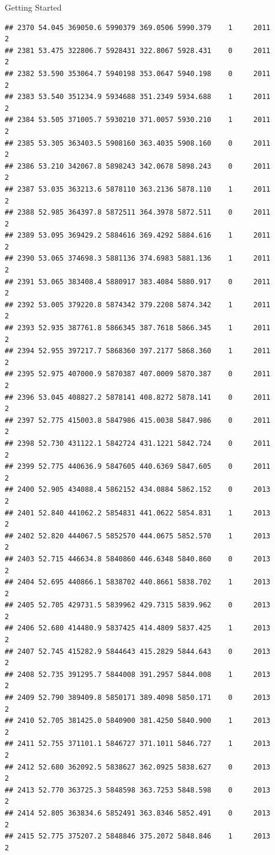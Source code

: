 \documentclass[
  ignorenonframetext,
]{beamer}
\begin{document}
\begin{frame}[fragile]{Getting Started}
\begin{verbatim}
## 2370 54.045 369050.6 5990379 369.0506 5990.379    1     2011        2
## 2381 53.475 322806.7 5928431 322.8067 5928.431    0     2011        2
## 2382 53.590 353064.7 5940198 353.0647 5940.198    0     2011        2
## 2383 53.540 351234.9 5934688 351.2349 5934.688    1     2011        2
## 2384 53.505 371005.7 5930210 371.0057 5930.210    1     2011        2
## 2385 53.305 363403.5 5908160 363.4035 5908.160    0     2011        2
## 2386 53.210 342067.8 5898243 342.0678 5898.243    0     2011        2
## 2387 53.035 363213.6 5878110 363.2136 5878.110    1     2011        2
## 2388 52.985 364397.8 5872511 364.3978 5872.511    0     2011        2
## 2389 53.095 369429.2 5884616 369.4292 5884.616    1     2011        2
## 2390 53.065 374698.3 5881136 374.6983 5881.136    1     2011        2
## 2391 53.065 383408.4 5880917 383.4084 5880.917    0     2011        2
## 2392 53.005 379220.8 5874342 379.2208 5874.342    1     2011        2
## 2393 52.935 387761.8 5866345 387.7618 5866.345    1     2011        2
## 2394 52.955 397217.7 5868360 397.2177 5868.360    1     2011        2
## 2395 52.975 407000.9 5870387 407.0009 5870.387    0     2011        2
## 2396 53.045 408827.2 5878141 408.8272 5878.141    0     2011        2
## 2397 52.775 415003.8 5847986 415.0038 5847.986    0     2011        2
## 2398 52.730 431122.1 5842724 431.1221 5842.724    0     2011        2
## 2399 52.775 440636.9 5847605 440.6369 5847.605    0     2011        2
## 2400 52.905 434088.4 5862152 434.0884 5862.152    0     2013        2
## 2401 52.840 441062.2 5854831 441.0622 5854.831    1     2013        2
## 2402 52.820 444067.5 5852570 444.0675 5852.570    1     2013        2
## 2403 52.715 446634.8 5840860 446.6348 5840.860    0     2013        2
## 2404 52.695 440866.1 5838702 440.8661 5838.702    1     2013        2
## 2405 52.705 429731.5 5839962 429.7315 5839.962    0     2013        2
## 2406 52.680 414480.9 5837425 414.4809 5837.425    1     2013        2
## 2407 52.745 415282.9 5844643 415.2829 5844.643    0     2013        2
## 2408 52.735 391295.7 5844008 391.2957 5844.008    1     2013        2
## 2409 52.790 389409.8 5850171 389.4098 5850.171    0     2013        2
## 2410 52.705 381425.0 5840900 381.4250 5840.900    1     2013        2
## 2411 52.755 371101.1 5846727 371.1011 5846.727    1     2013        2
## 2412 52.680 362092.5 5838627 362.0925 5838.627    0     2013        2
## 2413 52.770 363725.3 5848598 363.7253 5848.598    0     2013        2
## 2414 52.805 363834.6 5852491 363.8346 5852.491    0     2013        2
## 2415 52.775 375207.2 5848846 375.2072 5848.846    1     2013        2

\end{verbatim}
\end{frame}
\end{document}
